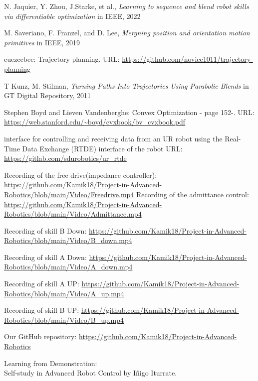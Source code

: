 \begin{flushleft}
    \begin{thebibliography}{99}

            N. Jaquier, Y. Zhou, J.Starke, et al., {\it{Learning to sequence and blend robot skills via differentiable optimization}} in IEEE, 2022

            M. Saveriano, F. Franzel, and D. Lee, {\it{Mergning position and orientation motion primitives}} in IEEE, 2019       

            cuezeebee: Trajectory planning. URL: \url{https://github.com/novice1011/trajectory-planning}

            T Kunz, M. Stilman, {\it{Turning Paths Into Trajectories Using Parabolic Blends}} in GT Digital Repository, 2011

            Stephen Boyd and Lieven Vandenberghe: Convex Optimization - page 152-. URL: \url{https://web.stanford.edu/~boyd/cvxbook/bv_cvxbook.pdf}

            interface for controlling and receiving data from an UR robot using the Real-Time Data Exchange (RTDE) interface of the robot URL: \url{https://gitlab.com/sdurobotics/ur_rtde}

            Recording of the free drive(impedance controller): \url{https://github.com/Kamik18/Project-in-Advanced-Robotics/blob/main/Video/Freedrive.mp4}
            Recording of the admittance control: \url{https://github.com/Kamik18/Project-in-Advanced-Robotics/blob/main/Video/Admittance.mp4}

            Recording of skill B Down: \url{https://github.com/Kamik18/Project-in-Advanced-Robotics/blob/main/Video/B_down.mp4}

            Recording of skill A Down: \url{https://github.com/Kamik18/Project-in-Advanced-Robotics/blob/main/Video/A_down.mp4}
            
            Recording of skill A UP: \url{https://github.com/Kamik18/Project-in-Advanced-Robotics/blob/main/Video/A_up.mp4}

            Recording of skill B UP: \url{https://github.com/Kamik18/Project-in-Advanced-Robotics/blob/main/Video/B_up.mp4}

            Our GitHub repository: \url{https://github.com/Kamik18/Project-in-Advanced-Robotics}
            
            Learning from Demonstration:\\ 
        Self-study in Advanced Robot Control by Iñigo Iturrate.
    \end{thebibliography}
\end{flushleft}